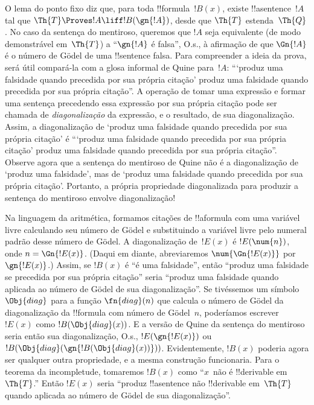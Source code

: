 \documentclass[../../../include/open-logic-section]{subfiles}
\begin{document}


\begin{explain}
O lema do ponto fixo diz que, para toda !!{formula}~$!B(x)$, existe
!!a{sentence}~$!A$ tal que $\Th{T} \Proves !A \liff !B(\gn{!A})$,
desde que $\Th{T}$ estenda~$\Th{Q}$. No caso da sentença do mentiroso,
queremos que $!A$ seja equivalente (de modo demonstrável em~$\Th{T}$) a
``$\gn{!A}$ é falsa'', O.s.\@, à afirmação de que $\Gn{!A}$ é o número de
G\"odel de uma !!{sentence} falsa. Para compreender a ideia da prova, será
útil compará-la com a glosa informal de Quine para~$!A$: ``{}`produz uma
falsidade quando precedida por sua própria citação' produz uma falsidade
quando precedida por sua própria citação''. A operação de tomar uma
expressão e formar uma sentença precedendo essa expressão por sua própria
citação pode ser chamada de \emph{diagonalização} da expressão, e o
resultado, de sua diagonalização. Assim, a diagonalização de `produz uma
falsidade quando precedida por sua própria citação' é ``{}`produz uma
falsidade quando precedida por sua própria citação' produz uma falsidade
quando precedida por sua própria citação''. Observe agora que a sentença do
mentiroso de Quine não é a diagonalização de `produz uma falsidade', mas de
`produz uma falsidade quando precedida por sua própria citação'. Portanto,
a própria propriedade diagonalizada para produzir a sentença do mentiroso
envolve diagonalização!{}

Na linguagem da aritmética, formamos citações de !!a{formula} com uma
variável livre calculando seu número de G\"odel e substituindo a variável
livre pelo numeral padrão desse número de G\"odel. A diagonalização
de~$!E(x)$ é $!E(\num{n})$, onde $n = \Gn{!E(x)}$. (Daqui em diante,
abreviaremos $\num{\Gn{!E(x)}}$ por $\gn{!E(x)}$.) Assim, se $!B(x)$ é
``é uma falsidade'', então ``produz uma falsidade se precedida por sua
própria citação'' seria ``produz uma falsidade quando aplicada ao número de
G\"odel de sua diagonalização''. Se tivéssemos um símbolo~$\Obj{diag}$ para
a função $\fn{diag}(n)$ que calcula o número de G\"odel da diagonalização da
!!{formula} com número de G\"odel~$n$, poderíamos escrever $!E(x)$ como
$!B(\Obj{diag}(x))$. E a versão de Quine da sentença do mentiroso seria
então sua diagonalização, O.s.\@, $!E(\gn{!E(x)})$ ou
$!B(\Obj{diag}(\gn{!B(\Obj{diag}(x))}))$. Evidentemente, $!B(x)$ poderia
agora ser qualquer outra propriedade, e a mesma construção funcionaria.
Para o teorema da incompletude, tomaremos $!B(x)$ como ``$x$~não é
!!{derivable} em~$\Th{T}$.'' Então $!E(x)$ seria ``produz
!!a{sentence} não !!{derivable} em~$\Th{T}$ quando aplicada ao número de
G\"odel de sua diagonalização''.


\end{explain}
\end{document}

